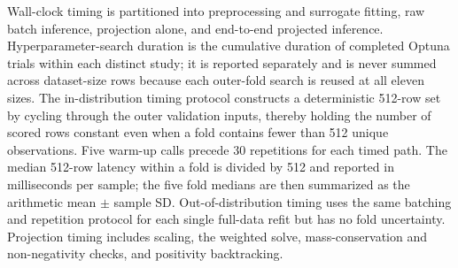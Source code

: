 \documentclass[a4paper,fleqn]{cas-sc}
\begin{document}
Wall-clock timing is partitioned into preprocessing and surrogate fitting, raw batch inference, projection alone, and end-to-end projected inference. Hyperparameter-search duration is the cumulative duration of completed Optuna trials within each distinct study; it is reported separately and is never summed across dataset-size rows because each outer-fold search is reused at all eleven sizes. The in-distribution timing protocol constructs a deterministic 512-row set by cycling through the outer validation inputs, thereby holding the number of scored rows constant even when a fold contains fewer than 512 unique observations. Five warm-up calls precede 30 repetitions for each timed path. The median 512-row latency within a fold is divided by 512 and reported in milliseconds per sample; the five fold medians are then summarized as the arithmetic mean $\pm$ sample SD. Out-of-distribution timing uses the same batching and repetition protocol for each single full-data refit but has no fold uncertainty. Projection timing includes scaling, the weighted solve, mass-conservation and non-negativity checks, and positivity backtracking.
\end{document}
